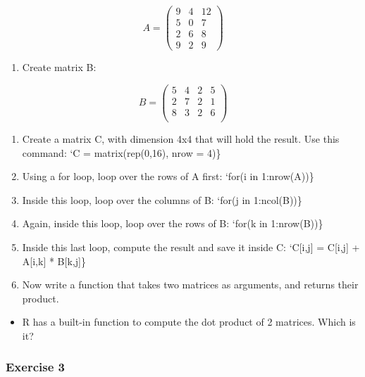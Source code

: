 \documentclass[]{gitbook}
\providecommand{\tightlist}{%
  \setlength{\itemsep}{0pt}\setlength{\parskip}{0pt}}
\begin{document}
\[A = \left(
  \begin{array}{ccc}
   9 & 4 & 12 \\
   5 & 0 & 7 \\
   2 & 6 & 8 \\
   9 & 2 & 9
  \end{array} \right)
\]

\begin{enumerate}
\def\labelenumi{\arabic{enumi})}
\setcounter{enumi}{1}
\tightlist
\item
  Create matrix B:
\end{enumerate}

\[B = \left(
\begin{array}{cccc}
 5 & 4 & 2 & 5 \\
 2 & 7 & 2 & 1 \\
 8 & 3 & 2 & 6 \\
\end{array} \right)
\]

\begin{enumerate}
\def\labelenumi{\arabic{enumi})}
\setcounter{enumi}{2}
\item
  Create a matrix C, with dimension 4x4 that will hold the result. Use this command: `C = matrix(rep(0,16), nrow = 4)\}
\item
  Using a for loop, loop over the rows of A first: `for(i in 1:nrow(A))\}
\item
  Inside this loop, loop over the columns of B: `for(j in 1:ncol(B))\}
\item
  Again, inside this loop, loop over the rows of B: `for(k in 1:nrow(B))\}
\item
  Inside this last loop, compute the result and save it inside C: `C{[}i,j{]} = C{[}i,j{]} + A{[}i,k{]} * B{[}k,j{]}\}
\item
  Now write a function that takes two matrices as arguments, and returns their product.
\end{enumerate}

\begin{itemize}
\tightlist
\item
  R has a built-in function to compute the dot product of 2 matrices. Which is it?
\end{itemize}

\hypertarget{exercise-3-3}{%
\subsubsection*{Exercise 3}\label{exercise-3-3}}
\end{document}
